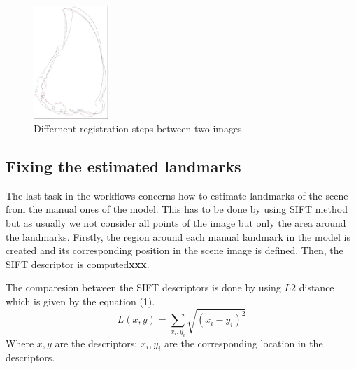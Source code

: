 \documentclass[twoside,twocolumn,10pt]{article}
\begin{document}
\begin{figure}[htb]
    \centering
    \includegraphics[width=0.25\textwidth]{./images/imreg}
    \caption{Differnent registration steps between two images}
    \label{fig:box}
\end{figure}
\subsection{Fixing the estimated landmarks}
The last task in the workflows concerns how to estimate landmarks of the scene from the manual ones of the model. This has to be done by using SIFT\cite{lowe2004distinctive} method but as usually we not consider all points of the image but only the area around the landmarks. Firstly, the region around each manual landmark in the model is created and its corresponding position in the scene image is defined. Then, the SIFT descriptor is computed\textbf{xxx}.

The comparesion between the SIFT descriptors is done by using $L2$ distance which is given by the equation (1).
\begin{equation}
\label{eq:cross-correlation}
	L(x,y) = \sum\limits_{x_i,y_i}\sqrt{(x_i-y_i)^2}
\end{equation}
Where $x, y $ are the descriptors; $x_i, y_i $ are the corresponding location in the descriptors.\\
\end{document}
